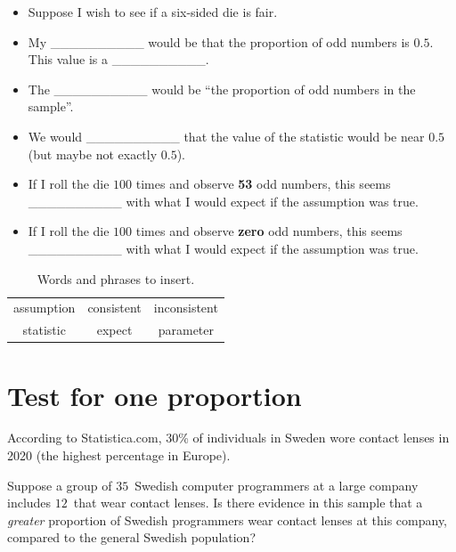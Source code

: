 \documentclass[
  11pt,
  a4paper,
  krantz2]{krantz}
\makeatletter
\providecommand{\tightlist}{%
  \setlength{\itemsep}{0pt}\setlength{\parskip}{0pt}}
\renewenvironment{quote}%
{\begin{kframe}}
{\end{kframe}}
\newenvironment{kframe}{%
\medskip{}
\setlength{\fboxsep}{.8em}
 \def\at@end@of@kframe{}%
 \ifinner\ifhmode%
  \def\at@end@of@kframe{\end{minipage}}%
  \begin{minipage}{\columnwidth}%
 \fi\fi%
 \def\FrameCommand##1{\hskip\@totalleftmargin \hskip-\fboxsep
 \colorbox{shadecolor}{##1}\hskip-\fboxsep
     \hskip-\linewidth \hskip-\@totalleftmargin \hskip\columnwidth}%
 \MakeFramed {\advance\hsize-\width
   \@totalleftmargin\z@ \linewidth\hsize
   \@setminipage}}%
 {\par\unskip\endMakeFramed%
 \at@end@of@kframe}
\renewenvironment{quote}
               {\list{}{\vspace{-0.5em}\begin{kframe}\small%
                        \rightmargin   \leftmargin
                        \parsep        \z@ \@plus\p@}%
                \item\relax}
               {\end{kframe}\endlist}
\makeatother
\begin{document}
\begin{quote}
\begin{itemize}
\tightlist
\item
  Suppose I wish to see if a six-sided die is fair.\\
\item
  My \_\_\_\_\_\_\_\_\_\_ would be that the proportion of odd numbers is \(0.5\).
  This value is a \_\_\_\_\_\_\_\_\_\_.\\
\item
  The \_\_\_\_\_\_\_\_\_\_ would be ``the proportion of odd numbers in the sample''.\\
\item
  We would \_\_\_\_\_\_\_\_\_\_ that the value of the statistic would be near \(0.5\) (but maybe not exactly \(0.5\)).\\
\item
  If I roll the die \(100\) times and observe \textbf{53} odd numbers, this seems \_\_\_\_\_\_\_\_\_\_ with what I would expect if the assumption was true.\\
\item
  If I roll the die \(100\) times and observe \textbf{zero} odd numbers, this seems \_\_\_\_\_\_\_\_\_\_ with what I would expect if the assumption was true.
\end{itemize}
\end{quote}

\begin{table}
\centering
\caption{\label{tab:Words3Table}Words and phrases to insert.}
\centering
\fontsize{10}{12}\selectfont
\begin{tabular}[t]{ccc}
\toprule
assumption & consistent & inconsistent\\
statistic & expect & parameter\\
\bottomrule
\end{tabular}
\end{table}

\section{Test for one proportion}\label{HTOneProportionA}

According to
Statistica.com,
\(30\)\% of individuals in Sweden wore contact lenses in 2020 (the highest percentage in Europe).

Suppose a group of \(35\)~Swedish computer programmers at a large company includes \(12\)~that wear contact lenses.
Is there evidence in this sample that a \emph{greater} proportion of Swedish programmers wear contact lenses at this company, compared to the general Swedish population?
\end{document}
